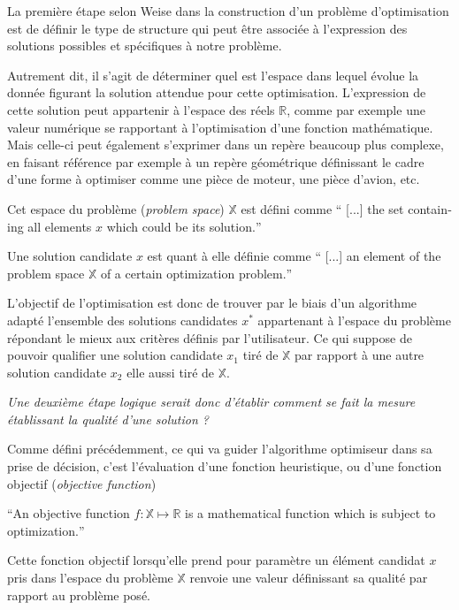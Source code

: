 La première étape selon Weise dans la construction d'un problème d'optimisation est de définir le type de structure qui peut être associée à l'expression des solutions possibles et spécifiques à notre problème.

Autrement dit, il s'agit de déterminer quel est l'espace dans lequel évolue la donnée figurant la solution attendue pour cette optimisation. L'expression de cette solution peut appartenir à l'espace des réels $\mathbb{R}$, comme par exemple une valeur numérique se rapportant à l'optimisation d'une fonction mathématique. Mais celle-ci peut également s'exprimer dans un repère beaucoup plus complexe, en faisant référence par exemple à un repère géométrique définissant le cadre  d'une forme à optimiser comme une pièce de moteur, une pièce d'avion, etc. \autocite[43]{Weise2011}

Cet espace du problème (\textit{problem space}) $\mathbb{X}$ est défini comme \foreignquote{english}{ [...] the set containing all elements $x$ which could be its solution.}

Une solution candidate $x$ est quant à elle définie comme \foreignquote{english}{ [...] an element of the problem space $ \mathbb{X}$ of a certain optimization problem.}

L'objectif de l'optimisation est donc de trouver par le biais d'un algorithme adapté l'ensemble des solutions candidates $x^*$ appartenant à l'espace du problème répondant le mieux aux critères définis par l'utilisateur. Ce qui suppose de pouvoir qualifier une solution candidate $x_1$ tiré de $\mathbb{X}$ par rapport à une autre solution candidate $x_2$ elle aussi tiré de $\mathbb{X}$.

\textit{Une deuxième étape logique serait donc d'établir comment se fait la mesure établissant la qualité d'une solution ?}

Comme défini précédemment, ce qui va guider l'algorithme optimiseur dans sa prise de décision, c'est l'évaluation d'une fonction heuristique, ou d'une fonction objectif (\textit{objective function}) 

\foreignquote{english}{An objective function $f: \mathbb{X} \mapsto \mathbb{R}$ is a mathematical function which is subject to optimization.}

Cette fonction objectif lorsqu'elle prend pour paramètre un élément candidat $x$ pris dans l'espace du problème $ \mathbb{X}$ renvoie une valeur définissant sa qualité par rapport au problème posé. \autocite[44]{Weise2011}

